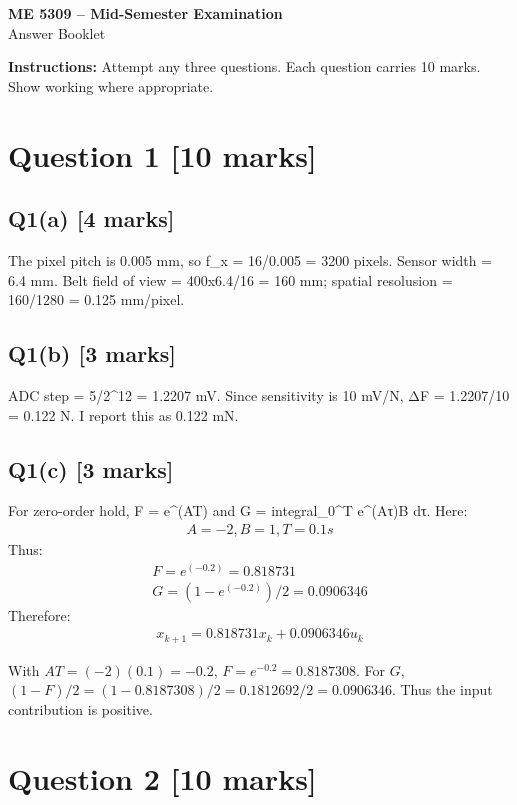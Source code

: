 \documentclass[11pt,a4paper]{article}
\begin{document}
\begin{center}
{\Large\bfseries ME 5309 -- Mid-Semester Examination}\\[3pt]
{\large Answer Booklet}\\[8pt]
\end{center}
\textbf{Instructions:} Attempt any three questions. Each question carries 10 marks. Show working where appropriate.
\section*{Question 1 \hfill [10 marks]}
\subsection*{Q1(a) \hfill [4 marks]}

The pixel pitch is 0.005 mm, so f\_x = 16/0.005 = 3200 pixels.
Sensor width = 6.4 mm.
Belt field of view = 400x6.4/16 = 160 mm; spatial resolusion = 160/1280 = 0.125 mm/pixel.

\subsection*{Q1(b) \hfill [3 marks]}

ADC step = 5/2\textasciicircum{}12 = 1.2207 mV.
Since sensitivity is 10 mV/N, ΔF = 1.2207/10 = 0.122 N.
I report this as 0.122 mN.

\subsection*{Q1(c) \hfill [3 marks]}

For zero-order hold, F = e\textasciicircum{}(AT) and G = integral\_0\textasciicircum{}T e\textasciicircum{}(Aτ)B dτ.
Here:\[\begin{aligned}A = -2, B = 1, T = 0.1 s\end{aligned}\]
Thus:\[\begin{aligned}F = e^(-0.2) = 0.818731\\ G = (1-e^(-0.2))/2 = 0.0906346\end{aligned}\]
Therefore:\[\begin{aligned}x_{k+1} = 0.818731 x_k + 0.0906346 u_k\end{aligned}\]\par\smallskip With $AT=(-2)(0.1)=-0.2$, $F=e^{-0.2}=0.8187308$. For $G$, $(1-F)/2=(1-0.8187308)/2=0.1812692/2=0.0906346$. Thus the input contribution is positive.

\section*{Question 2 \hfill [10 marks]}
\end{document}
